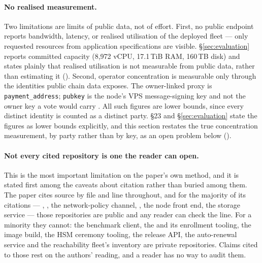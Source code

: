 \paragraph{No realised measurement.} Two limitations are limits of public data, not of effort. First,
no public endpoint reports bandwidth, latency, or realised utilisation of the deployed fleet — only
requested resources from application specifications are visible. \S\ref{sec:evaluation} reports committed capacity
(8,972 vCPU, 17.1\,TiB RAM, 160\,TB disk) and states plainly that realised utilisation is not
measurable from public data, rather than estimating it (). Second, operator
concentration is measurable only through the identities public chain data exposes. The owner-linked
proxy is \texttt{payment\_address}; \texttt{pubkey} is the node's VPS message-signing key and not the
owner key a vote would carry . All such figures are lower
bounds, since every distinct identity is counted as a distinct party. §23 and \S\ref{sec:evaluation} state the figures as lower bounds
explicitly, and this section restates the true concentration measurement, by party rather than by
key, as an open problem below ().

\paragraph{Not every cited repository is one the reader can open.} This is the most important
limitation on the paper's own method, and it is stated first among the caveats about citation rather
than buried among them. The paper cites source by file and line throughout, and for the majority of
its citations --- \fluxd{}, \FluxOS{}, the network-policy channel, \FDM{}, the node front end, the
storage service --- those repositories are public and any reader can check the line. For a minority
they cannot: the benchmark client, the \SAS{} and its enrollment tooling, the \ArcaneOS{} image
build, the HSM ceremony tooling, the release API, the auto-renewal service and the reachability
fleet's inventory are private repositories. Claims cited to those rest on the authors' reading, and
a reader has no way to audit them.

